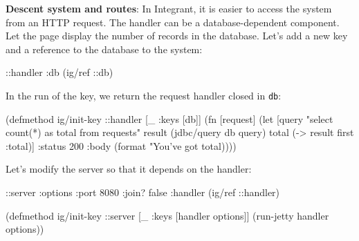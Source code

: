 
\textbf{Descent system and routes}: In Integrant, it is easier to access the system from an HTTP request. The handler can be a database-dependent component. Let the page display the number of records in the database. Let's add a new key and a reference to the database to the system:

\begin{english}
  \begin{clojure}
{::handler {:db (ig/ref ::db)}}
  \end{clojure}
\end{english}

\noindent
In the run of the key, we return the request handler closed in \verb|db|:

\ifnarrow

\begin{english}
  \begin{clojure}
(defmethod ig/init-key ::handler
  [_ {:keys [db]}]
  (fn [request]
    (let [query "select count(*) as total
                 from requests"
          result (jdbc/query db query)
          total (-> result first :total)]
      {:status 200
       :body (format
               "You've got %
               total)})))
  \end{clojure}
\end{english}

\else

\begin{english}
\end{english}

\fi

\noindent
Let's modify the server so that it depends on the handler:

\ifnarrow

\begin{english}
  \begin{clojure}
{::server {:options {:port 8080
                     :join? false}
           :handler (ig/ref ::handler)}}

(defmethod ig/init-key ::server
  [_ {:keys [handler options]}]
  (run-jetty handler options))
  \end{clojure}
\end{english}

